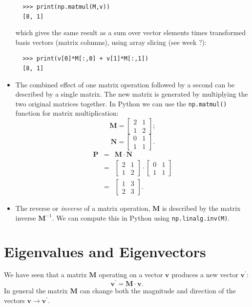 \documentclass[a4paper]{article}
\newcommand{\bvec}[1]{\boldsymbol{\mathbf{#1}}}
\begin{document}
\begin{itemize}
  \begin{lstlisting}
  >>> print(np.matmul(M,v))
  [8, 1]
  \end{lstlisting}
  which gives the same result as a sum over vector elements times transformed basis vectors (matrix columns), using array slicing (see week ?):
  \begin{lstlisting}
  >>> print(v[0]*M[:,0] + v[1]*M[:,1])
  [8, 1]
  \end{lstlisting}
  \item The combined effect of one matrix operation followed by a second can be described by a single matrix. The new matrix is generated by multiplying the two original matrices together. In Python we can use the \texttt{np.matmul()} function for matrix multiplication:
  \begin{equation*}
  \bvec{M}  =  \begin{bmatrix}2&1\\1&2\end{bmatrix};
  \end{equation*}
  \begin{equation*}
  \bvec{N}  =  \begin{bmatrix}0&1\\1&1\end{bmatrix}.
  \end{equation*}
  \begin{eqnarray*}
  \bvec{P}& = & \bvec{M}\cdot\bvec{N} \\
          & = & \begin{bmatrix}2&1\\1&2\end{bmatrix}\cdot\begin{bmatrix}0&1\\1&1\end{bmatrix} \\
          & = & \begin{bmatrix}1&3\\2&3\end{bmatrix}.
  \end{eqnarray*}
  \item The reverse or \emph{inverse} of a matrix operation, $\bvec{M}$ is described by the matrix inverse $\bvec{M}^{-1}$. We can compute this in Python using \texttt{np.linalg.inv(M)}.
\end{itemize}
\pagebreak
\section{Eigenvalues and Eigenvectors}
We have seen that a matrix $\bvec{M}$ operating on a vector $\bvec{v}$ produces a new vector $\bvec{v^\prime}$:
\begin{equation*}
\bvec{v}^\prime = \bvec{M}\cdot\bvec{v}.
\end{equation*}
In general the matrix $\bvec{M}$ can change both the magnitude and direction of the vectors $\bvec{v}\to\bvec{v^\prime}$. 
\end{document}

